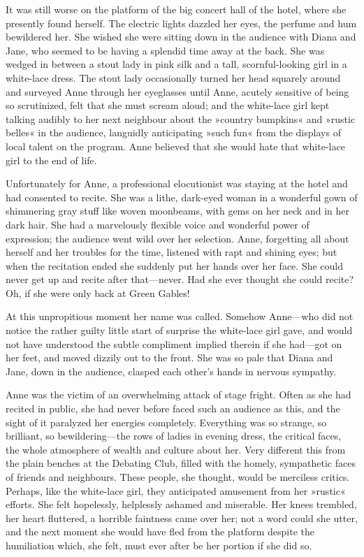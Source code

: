 It was still worse on the platform of the big concert hall of the hotel, where she presently found herself. The electric lights dazzled her eyes, the perfume and hum bewildered her. She wished she were sitting down in the audience with Diana and Jane, who seemed to be having a splendid time away at the back. She was wedged in between a stout lady in pink silk and a tall, scornful-looking girl in a white-lace dress. The stout lady occasionally turned her head squarely around and surveyed Anne through her eyeglasses until Anne, acutely sensitive of being so scrutinized, felt that she must scream aloud; and the white-lace girl kept talking audibly to her next neighbour about the »country bumpkins« and »rustic belles« in the audience, languidly anticipating »such fun« from the displays of local talent on the program. Anne believed that she would hate that white-lace girl to the end of life.

Unfortunately for Anne, a professional elocutionist was staying at the hotel and had consented to recite. She was a lithe, dark-eyed woman in a wonderful gown of shimmering gray stuff like woven moonbeams, with gems on her neck and in her dark hair. She had a marvelously flexible voice and wonderful power of expression; the audience went wild over her selection. Anne, forgetting all about herself and her troubles for the time, listened with rapt and shining eyes; but when the recitation ended she suddenly put her hands over her face. She could never get up and recite after that—never. Had she ever thought she could recite? Oh, if she were only back at Green Gables!

At this unpropitious moment her name was called. Somehow Anne—who did not notice the rather guilty little start of surprise the white-lace girl gave, and would not have understood the subtle compliment implied therein if she had—got on her feet, and moved dizzily out to the front. She was so pale that Diana and Jane, down in the audience, clasped each other’s hands in nervous sympathy.

Anne was the victim of an overwhelming attack of stage fright. Often as she had recited in public, she had never before faced such an audience as this, and the sight of it paralyzed her energies completely. Everything was so strange, so brilliant, so bewildering—the rows of ladies in evening dress, the critical faces, the whole atmosphere of wealth and culture about her. Very different this from the plain benches at the Debating Club, filled with the homely, sympathetic faces of friends and neighbours. These people, she thought, would be merciless critics. Perhaps, like the white-lace girl, they anticipated amusement from her »rustic« efforts. She felt hopelessly, helplessly ashamed and miserable. Her knees trembled, her heart fluttered, a horrible faintness came over her; not a word could she utter, and the next moment she would have fled from the platform despite the humiliation which, she felt, must ever after be her portion if she did so.

